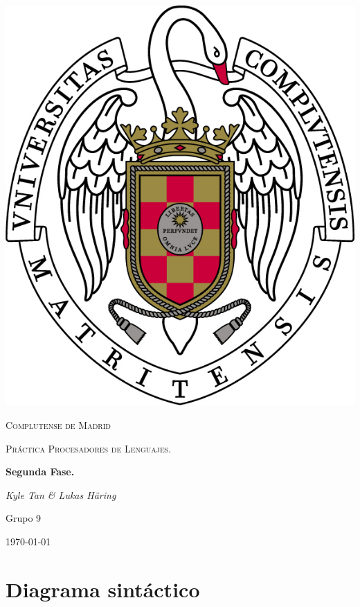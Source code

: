 \documentclass{article}
\begin{document}
\usetikzlibrary{automata,arrows, positioning}
\renewcommand{\contentsname}{Tabla de contenidos}

\begin{titlepage}
	\begin{center}
		\includegraphics{escudo.jpg}
	\end{center}
	\centering
	{\scshape\LARGE Complutense de Madrid \par}
	\vspace{1cm}
	{\scshape\Large Práctica Procesadores de Lenguajes.\par}
	\vspace{1.5cm}
	{\huge\bfseries Segunda Fase. \par}
	\vspace{2cm}
	{\Large\itshape Kyle Tan \& Lukas Häring\par}
	{\large Grupo 9\par}
	\vfill
	\vfill

	{\large \today\par}
\end{titlepage}

\tableofcontents
\newpage
\section{Diagrama sintáctico}
\end{document}
